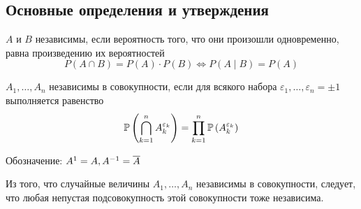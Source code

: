 \subsection{Основные определения и утверждения}
\begin{definition}
    $A$ и $B$ независимы, если вероятность того,
    что они произошли одновременно, равна произведению их вероятностей
    $$P\left(A\cap B\right)
    =P\left(A\right)\cdot P\left(B\right)\Leftrightarrow P\left(A\mid B\right)
    =P\left(A\right)$$
\end{definition}
\begin{definition}
    $A_1, \dots, A_n$ независимы в совокупности,
    если для всякого набора $\varepsilon_1, \dots, \varepsilon_n=\pm 1$
    выполняется равенство
    $$\mathbb{P}\left( \bigcap_{k=1}^n A_{k}^{\varepsilon_k} \right)
    =\prod_{k=1}^n \mathbb{P}\left( A_{k}^{\varepsilon_k} \right)$$

    Обозначение: $A^1=A, A^{-1}=\overline{A}$
\end{definition}
\begin{affirmation}
    Из того, что случайные величины $A_1, \dots, A_n$ независимы в совокупности,
    следует, что любая непустая подсовокупность этой совокупности
    тоже независима.
\end{affirmation}
